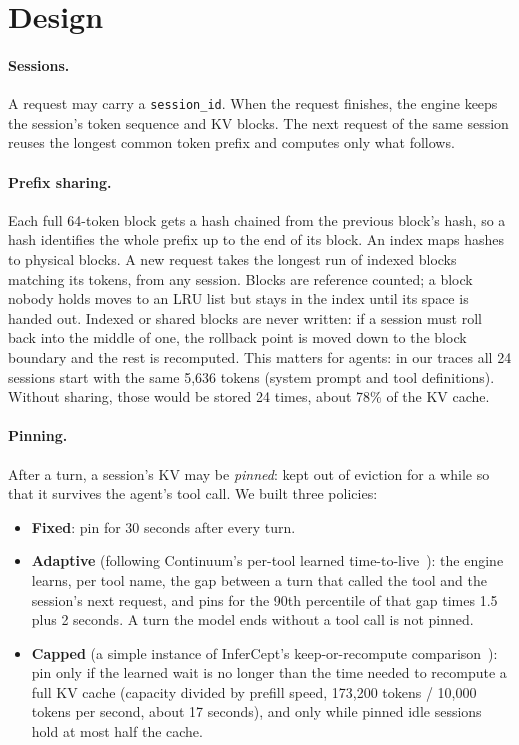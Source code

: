 \documentclass[11pt]{article}
\begin{document}
\section{Design}
\label{sec:design}

\paragraph{Sessions.} A request may carry a \texttt{session\_id}. When the request finishes, the engine keeps the session's token sequence and KV blocks. The next request of the same session reuses the longest common token prefix and computes only what follows.

\paragraph{Prefix sharing.} Each full 64-token block gets a hash chained from the previous block's hash, so a hash identifies the whole prefix up to the end of its block. An index maps hashes to physical blocks. A new request takes the longest run of indexed blocks matching its tokens, from any session. Blocks are reference counted; a block nobody holds moves to an LRU list but stays in the index until its space is handed out. Indexed or shared blocks are never written: if a session must roll back into the middle of one, the rollback point is moved down to the block boundary and the rest is recomputed. This matters for agents: in our traces all 24 sessions start with the same 5,636 tokens (system prompt and tool definitions). Without sharing, those would be stored 24 times, about 78\% of the KV cache.

\paragraph{Pinning.} After a turn, a session's KV may be \emph{pinned}: kept out of eviction for a while so that it survives the agent's tool call. We built three policies:
\begin{itemize}
  \item \textbf{Fixed}: pin for 30 seconds after every turn.
  \item \textbf{Adaptive} (following Continuum's per-tool learned time-to-live~\cite{continuum}): the engine learns, per tool name, the gap between a turn that called the tool and the session's next request, and pins for the 90th percentile of that gap times 1.5 plus 2 seconds. A turn the model ends without a tool call is not pinned.
  \item \textbf{Capped} (a simple instance of InferCept's keep-or-recompute comparison~\cite{infercept}): pin only if the learned wait is no longer than the time needed to recompute a full KV cache (capacity divided by prefill speed, 173,200 tokens / 10,000 tokens per second, about 17 seconds), and only while pinned idle sessions hold at most half the cache.
\end{itemize}
\end{document}
